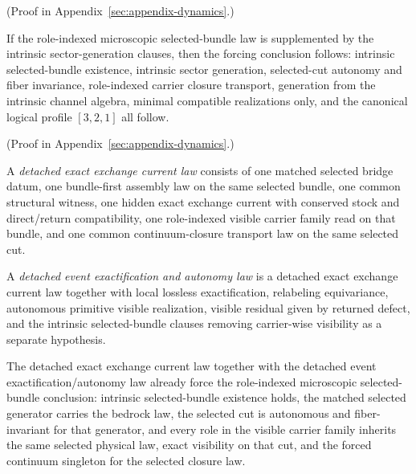 (Proof in Appendix~\ref{sec:appendix-dynamics}.)

\begin{theorem}
\label{thm:role-indexed-microscopic-sector-law-closes-current-forcing-seam}
If the role-indexed microscopic selected-bundle law is supplemented by the
intrinsic sector-generation clauses, then the forcing conclusion follows: intrinsic
selected-bundle existence, intrinsic sector generation, selected-cut autonomy
and fiber invariance, role-indexed carrier closure transport, generation from
the intrinsic channel algebra, minimal compatible realizations only, and the
canonical logical profile \([3,2,1]\) all follow.
\end{theorem}

(Proof in Appendix~\ref{sec:appendix-dynamics}.)

\begin{definition}
\label{def:detached-exact-exchange-current-law}
A \emph{detached exact exchange current law} consists of one matched selected
bridge datum, one bundle-first assembly law on the same selected bundle, one
common structural witness, one hidden exact exchange current with
conserved stock and direct/return compatibility, one role-indexed visible
carrier family read on that bundle, and one common continuum-closure transport
law on the same selected cut.
\end{definition}

\begin{definition}
\label{def:detached-event-exactification-autonomy-law}
A \emph{detached event exactification and autonomy law} is a detached exact
exchange current law together with local lossless exactification,
relabeling equivariance, autonomous primitive visible realization, visible
residual given by returned defect, and the intrinsic selected-bundle clauses
removing carrier-wise visibility as a separate hypothesis.
\end{definition}

\begin{theorem}
\label{thm:two-law-detached-microscopic-package-forces-role-indexed-selected-bundle-surface}
The detached exact exchange current law together with the detached event
exactification/autonomy law already force the role-indexed microscopic
selected-bundle conclusion: intrinsic selected-bundle existence holds,
the matched selected generator carries the bedrock law, the selected cut is
autonomous and fiber-invariant for that generator, and every role in the
visible carrier family inherits the same selected physical law, exact
visibility on that cut, and the forced continuum singleton for the selected
closure law.
\end{theorem}

